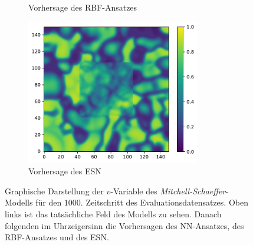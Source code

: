 \begin{appendices}
\begin{figure}[h]
\begin{subfigure}{.5\textwidth}
		\setcapmargin[1cm]{0.5cm}
  		\caption{Vorhersage des \textsc{RBF}-Ansatzes}
	\end{subfigure}%
	\begin{subfigure}{.5\textwidth}
		\centering
		\includegraphics[height=2.5in]{figures/results/inner_cross_prediction/mitchell_v_inner_esn.pdf}
		\setcapmargin[1cm]{0.5cm}
  		\caption{Vorhersage des \textsc{ESN}}
	\end{subfigure}
	\caption{Graphische Darstellung der $v$-Variable des \textit{Mitchell-Schaeffer}-Modells für den $1000$. Zeitschritt des Evaluationsdatensatzes. Oben links ist das tatsächliche Feld des Modells zu sehen. Danach folgenden im Uhrzeigersinn die Vorhersagen des \textsc{NN}-Ansatzes, des \textsc{RBF}-Ansatzes und des \textsc{ESN}.}
	\label{fig:apx_inner_cross_mitchell_result}
\end{figure} 

\end{appendices}